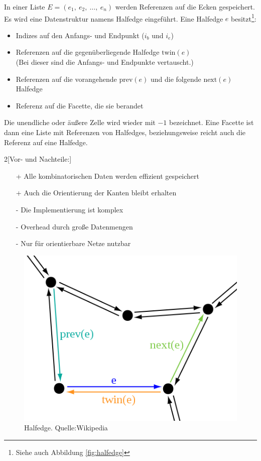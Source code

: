 \begin{Definition}[Halfedge]

In einer Liste $E = (e_1,~e_2,~\hdots,~e_n)$ werden Referenzen auf die Ecken 
gespeichert. 
Es wird eine Datenstruktur namens Halfedge eingeführt. 
Eine Halfedge $e$ besitzt\footnote{Siehe auch Abbildung \vref{fig:halfedge}}: 
\begin{itemize}
    \item Indizes auf den Anfangs- und Endpunkt ($i_b$ und $i_e$)
    \item Referenzen auf die gegenüberliegende Halfedge $\textrm{twin}(e)$\\
          (Bei dieser sind die Anfangs- und Endpunkte vertauscht.)
    \item Referenzen auf die vorangehende $\textrm{prev}(e)$ und die folgende 
          $\textrm{next}(e)$ Halfedge
    \item Referenz auf die Facette, die sie berandet
\end{itemize}
Die unendliche oder äußere Zelle wird wieder mit $-1$ bezeichnet. 
Eine Facette ist dann eine Liste mit Referenzen von Halfedges, beziehungsweise 
reicht auch die Referenz auf eine Halfedge.

\end{Definition}
\begin{multicols}{2}[Vor- und Nachteile:]
    \begin{itemize}
        \item[+] Alle kombinatorischen Daten werden effizient gespeichert
        \item[+] Auch die Orientierung der Kanten bleibt erhalten
        \vspace{10pt}
        \item[-] Die Implementierung ist komplex
        \item[-] Overhead durch große Datenmengen
        \item[-] Nur für orientierbare Netze nutzbar
    \end{itemize}
\end{multicols}

\begin{figure}[H]
    \centering 
    \includegraphics[scale=0.5]{images/halfedge.png}
    \caption{Halfedge. Quelle:Wikipedia}
    \label{fig:halfedge}
\end{figure}

